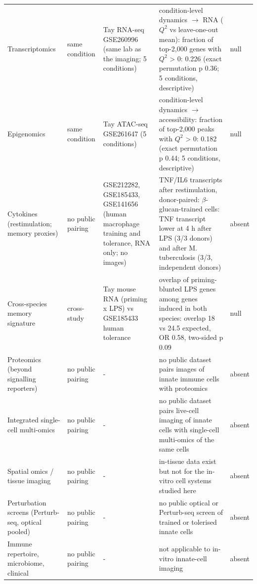 \begin{table}[t]
\begin{tabular}{p{2.6cm}p{1.5cm}p{3.6cm}p{4.9cm}p{1.1cm}}
Transcriptomics & same condition & Tay RNA-seq GSE260996 (same lab as the imaging; 5 conditions) & condition-level dynamics $\to$ RNA ($Q^2$ vs leave-one-out mean): fraction of top-2,000 genes with $Q^2$ > 0: 0.226 (exact permutation p 0.36; 5 conditions, descriptive) & null \\
Epigenomics & same condition & Tay ATAC-seq GSE261647 (5 conditions) & condition-level dynamics $\to$ accessibility: fraction of top-2,000 peaks with $Q^2$ > 0: 0.182 (exact permutation p 0.44; 5 conditions, descriptive) & null \\
Cytokines (restimulation; memory proxies) & no public pairing & GSE212282, GSE185433, GSE141656 (human macrophage training and tolerance, RNA only; no images) & TNF/IL6 transcripts after restimulation, donor-paired: $\beta$-glucan-trained cells: TNF transcript lower at 4 h after LPS (3/3 donors) and after M. tuberculosis (3/3, independent donors) & absent \\
Cross-species memory signature & cross-study & Tay mouse RNA (priming x LPS) vs GSE185433 human tolerance & overlap of priming-blunted LPS genes among genes induced in both species: overlap 18 vs 24.5 expected, OR 0.58, two-sided p 0.09 & null \\
Proteomics (beyond signalling reporters) & no public pairing & - & no public dataset pairs images of innate immune cells with proteomics & absent \\
Integrated single-cell multi-omics & no public pairing & - & no public dataset pairs live-cell imaging of innate cells with single-cell multi-omics of the same cells & absent \\
Spatial omics / tissue imaging & no public pairing & - & in-tissue data exist but not for the in-vitro cell systems studied here & absent \\
Perturbation screens (Perturb-seq, optical pooled) & no public pairing & - & no public optical or Perturb-seq screen of trained or tolerised innate cells & absent \\
Immune repertoire, microbiome, clinical & no public pairing & - & not applicable to in-vitro innate-cell imaging & absent \\
\bottomrule
\end{tabular}
\end{table}
